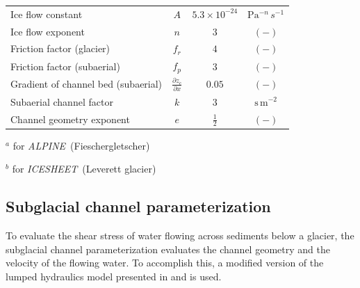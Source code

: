 \documentclass[11pt]{article}
\newcommand{\alpine}{\textit{ALPINE}\,}
\newcommand{\icesheet}{\textit{ICESHEET}\,}
\newcommand{\unit}[1]{$\mathrm{#1}$}
\begin{document}
\begin{table}[ht]
\begin{tabular}{ l  c  c c }
    Ice flow constant &$A$& $5.3\times10^{-24}$ &\unit{Pa}$^{-n}$\,$s^{-1}$\\
    Ice flow exponent &$n$& $3$ &$\mathrm{(-)}$\\
    Friction factor (glacier) & $f_r$ & $4$ & $\mathrm{(-)}$ \\
    Friction factor (subaerial) & $f_p$ & $3$ & $\mathrm{(-)}$\\
    Gradient of channel bed (subaerial) &$\frac{\partial z_c}{\partial x}$ &$0.05$& $\mathrm{(-)}$\\
    Subaerial channel factor & $k$ &$3$ & $\mathrm{s\,m^{-2}}$\\
    Channel geometry exponent &$e$& $\frac{1}{2}$&$\mathrm{(-)}$ \\
    \hline
  \end{tabular}
  \label{table:vpm}


  $^a$ for \alpine{} (Fieschergletscher)
  
  $^b$ for \icesheet{} (Leverett glacier)

\end{table}
  
\subsection{Subglacial channel  parameterization}
\label{sect:sub_mode}

To evaluate the shear stress of water flowing across sediments below a glacier, the subglacial channel parameterization evaluates the channel geometry and the velocity of the flowing water.
To accomplish this, a modified version of  the lumped hydraulics model presented in \citet{clarke1996} and \citet{werder2010} is used.
\end{document}
